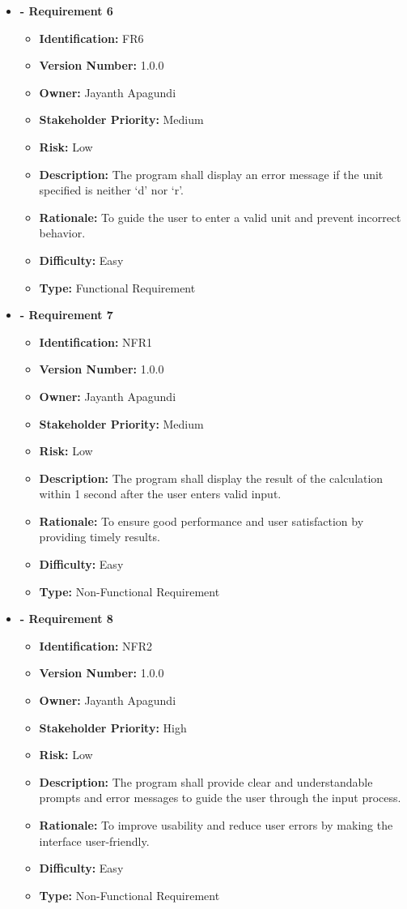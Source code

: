 \documentclass[11pt,a4paper,twoside]{article}
\begin{document}
\begin{itemize}[leftmargin=0pt,label={}]
\item \textbf{- Requirement 6}
\begin{itemize}
\item \textbf{Identification:} FR6
\item \textbf{Version Number:} 1.0.0
\item \textbf{Owner:} Jayanth Apagundi
\item \textbf{Stakeholder Priority:} Medium
\item \textbf{Risk:} Low
\item \textbf{Description:} The program shall display an error message if the unit specified is neither ‘d’ nor ‘r’.
\item \textbf{Rationale:} To guide the user to enter a valid unit and prevent incorrect behavior.
\item \textbf{Difficulty:} Easy
\item \textbf{Type:} Functional Requirement
\end{itemize}

\item \textbf{- Requirement 7}
\begin{itemize}
\item \textbf{Identification:} NFR1
\item \textbf{Version Number:} 1.0.0
\item \textbf{Owner:} Jayanth Apagundi
\item \textbf{Stakeholder Priority:} Medium
\item \textbf{Risk:} Low
\item \textbf{Description:} The program shall display the result of the calculation within 1 second after the user enters valid input.
\item \textbf{Rationale:} To ensure good performance and user satisfaction by providing timely results.
\item \textbf{Difficulty:} Easy
\item \textbf{Type:} Non-Functional Requirement
\end{itemize}

\item \textbf{- Requirement 8}
\begin{itemize}
\item \textbf{Identification:} NFR2
\item \textbf{Version Number:} 1.0.0
\item \textbf{Owner:} Jayanth Apagundi
\item \textbf{Stakeholder Priority:} High
\item \textbf{Risk:} Low
\item \textbf{Description:} The program shall provide clear and understandable prompts and error messages to guide the user through the input process.
\item \textbf{Rationale:} To improve usability and reduce user errors by making the interface user-friendly.
\item \textbf{Difficulty:} Easy
\item \textbf{Type:} Non-Functional Requirement
\end{itemize}

\end{itemize}
\end{document}
